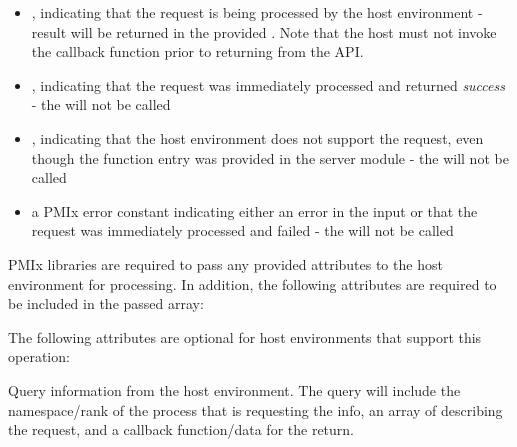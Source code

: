 \begin{itemize}
    \item {}, indicating that the request is being processed by the host environment - result will be returned in the provided . Note that the host must not invoke the callback function prior to returning from the \ac{API}.
    \item {}, indicating that the request was immediately processed and returned \textit{success} - the  will not be called
    \item {}, indicating that the host environment does not support the request, even though the function entry was provided in the server module - the  will not be called
    \item a PMIx error constant indicating either an error in the input or that the request was immediately processed and failed - the  will not be called
\end{itemize}

\reqattrstart
\ac{PMIx} libraries are required to pass any provided attributes to the host environment for processing. In addition, the following attributes are required to be included in the passed  array:


\reqattrend


\optattrstart
The following attributes are optional for host environments that support this operation:


\optattrend
\descr

Query information from the host environment.
The query will include the namespace/rank of the process that is requesting the info, an array of  describing the request, and a callback function/data for the return.

